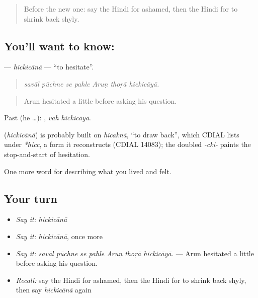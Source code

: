 \begin{quote}
Before the new one: say the Hindi for ashamed, then the Hindi for to shrink back shyly.
\end{quote}

\subsection*{You'll want to know: }
\textbf{} — \emph{hickicānā} — \textquotedblleft{}to hesitate\textquotedblright{}.

\begin{quote}
      
\end{quote}

\begin{quote}
\emph{savāl pūchne se pahle Aruṇ thoṛā hickicāyā.}
\end{quote}

\begin{quote}
Arun hesitated a little before asking his question.
\end{quote}

Past (he …):  , \emph{vah hickicāyā}.

\begin{cousinweb}
\textbf{} (\emph{hickicānā}) is probably built on \emph{hicaknā}, \textquotedblleft{}to draw back\textquotedblright{}, which CDIAL lists under \emph{*hicc}, a form it reconstructs (CDIAL 14083); the doubled \emph{-cki-} paints the stop-and-start of hesitation.
\end{cousinweb}

\begin{grammarlens}[title={What you've built}]
One more word for describing what you lived and felt.
\end{grammarlens}

\subsection*{Your turn}
\begin{itemize}
\raggedright
  \item \emph{Say it:} \emph{hickicānā}
  \item \emph{Say it:} \emph{hickicānā}, once more
  \item \emph{Say it:} \emph{savāl pūchne se pahle Aruṇ thoṛā hickicāyā.} — Arun hesitated a little before asking his question.
  \item \emph{Recall:} say the Hindi for ashamed, then the Hindi for to shrink back shyly, then say \emph{hickicānā} again
\end{itemize}

